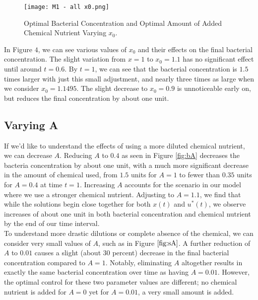 \documentclass[10pt]{article}
\theoremstyle{exmp}
\begin{document}
\begin{figure}
\centering
\texttt{[image: M1 - all x0.png]}
\caption{Optimal Bacterial Concentration and Optimal Amount of Added Chemical Nutrient Varying $x_0$.}
\label{fig:allx0}
\end{figure}

\noindent In Figure $4$, we can see various values of $x_0$ and their effects on the final bacterial concentration. The slight variation from $ x = 1$ to $x_0 = 1.1$ has no significant effect until around $t = 0.6$. By $t = 1$, we can see that the bacterial concentration is $1.5$ times larger with just this small adjustment, and nearly three times as large when we consider $x_0 = 1.1495$. The slight decrease to $x_0 = 0.9$ is unnoticeable early on, but reduces the final concentration by about one unit. \\

\newpage
\subsection{Varying A}

\noindent If we'd like to understand the effects of using a more diluted chemical nutrient, we can decrease $A$. Reducing $A$ to $0.4$ as seen in Figure \ref{fig:bA} decreases the bacteria concentration by about one unit, with a much more significant decrease in the amount of chemical used, from $1.5$ units for $A = 1$ to fewer than $0.35$ units for $A = 0.4$ at time $t = 1$. Increasing $A$ accounts for the scenario in our model where we use a stronger chemical nutrient. Adjusting to $A = 1.1$, we find that while the solutions begin close together for both $x(t)$ and $u^*(t)$, we observe increases of about one unit in both bacterial concentration and chemical nutrient by the end of our time interval.\\

\noindent To understand more drastic dilutions or complete absence of the chemical, we can consider very small values of $A$, such as in Figure $\ref{fig:sA}$. A further reduction of $A$ to $0.01$ causes a slight (about $30$ percent) decrease in the final bacterial concentration compared to $A = 1$. Notably, eliminating $A$ altogether results in exactly the same bacterial concentration over time as having $A = 0.01$. However, the optimal control for these two parameter values are different; no chemical nutrient is added for $A = 0$ yet for $A = 0.01$, a very small amount is added. \\
\end{document}
